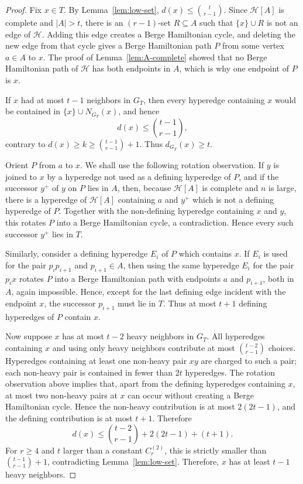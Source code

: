 \documentclass[12pt]{article}
\newcommand{\Hcal}{\mathcal H}
\begin{document}
\begin{proof}
Fix $x\in T$.  By Lemma~\ref{lem:low-set}, $d(x)\le\binom{t}{r-1}$.
Since $\Hcal[A]$ is complete and $|A|>t$, there is an $(r-1)$-set
$R\subseteq A$ such that $\{x\}\cup R$ is not an edge of $\Hcal$.
Adding this edge creates a Berge Hamiltonian cycle, and deleting the new
edge from that cycle gives a Berge Hamiltonian path $P$ from some
vertex $a\in A$ to $x$.  The proof of Lemma~\ref{lem:A-complete} showed
that no Berge Hamiltonian path of $\Hcal$ has both endpoints in $A$,
which is why one endpoint of $P$ is $x$.

If $x$ had at most $t-1$ neighbors in $G_T$, then every hyperedge
containing $x$ would be contained in $\{x\}\cup N_{G_T}(x)$, and hence
$$
        d(x)\le \binom{t-1}{r-1},
$$
contrary to $d(x)\ge k\ge \binom{t-1}{r-1}+1$.  Thus
$d_{G_T}(x)\ge t$.

Orient $P$ from $a$ to $x$.  We shall use the following rotation
observation.  If $y$ is joined to $x$ by a hyperedge not used as a
defining hyperedge of $P$, and if the successor $y^+$ of $y$ on $P$ lies
in $A$, then, because $\Hcal[A]$ is complete and $n$ is large, there is a
hyperedge of $\Hcal[A]$ containing $a$ and $y^+$ which is not a defining
hyperedge of $P$.  Together with the non-defining hyperedge containing
$x$ and $y$, this rotates $P$ into a Berge Hamiltonian cycle, a
contradiction.  Hence every such successor $y^+$ lies in $T$.

Similarly, consider a defining hyperedge $E_i$ of $P$ which contains
$x$.  If $E_i$ is used for the pair $p_i p_{i+1}$ and
$p_{i+1}\in A$, then using the same hyperedge $E_i$ for the pair
$p_i x$ rotates $P$ into a Berge Hamiltonian path with endpoints
$a$ and $p_{i+1}$, both in $A$, again impossible.  Hence, except for the
last defining edge incident with the endpoint $x$, the successor
$p_{i+1}$ must lie in $T$.  Thus at most $t+1$ defining hyperedges of
$P$ contain $x$.

Now suppose $x$ has at most $t-2$ heavy neighbors in $G_T$.  All
hyperedges containing $x$ and using only heavy neighbors contribute at
most $\binom{t-2}{r-1}$ choices.  Hyperedges containing at least one
non-heavy pair $xy$ are charged to such a pair; each non-heavy pair is
contained in fewer than $2t$ hyperedges.  The rotation observation above
implies that, apart from the defining hyperedges containing $x$, at most
two non-heavy pairs at $x$ can occur without creating a Berge Hamiltonian
cycle.  Hence the non-heavy contribution is at most
$2(2t-1)$, and the defining contribution is at most $t+1$.  Therefore
$$
        d(x)\le \binom{t-2}{r-1}+2(2t-1)+(t+1).
$$
For $r\ge4$ and $t$ larger than a constant $C_r^{(2)}$, this is strictly smaller than
$\binom{t-1}{r-1}+1$, contradicting Lemma~\ref{lem:low-set}.
Therefore, $x$ has at least $t-1$ heavy neighbors.
\end{proof}
\end{document}
